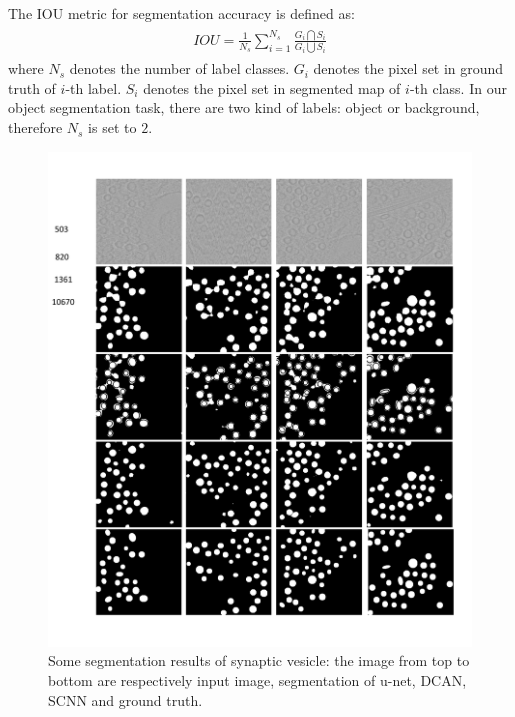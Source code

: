 The IOU metric for segmentation accuracy is defined as:
%
\begin{eqnarray}\label{fusion}
\begin{aligned}
IOU = \frac{1}{N_s}\sum_{i=1}^{N_s}\frac{G_i\bigcap S_i}{G_i\bigcup S_i}
\end{aligned}
\end{eqnarray}
%
where $N_s$ denotes the number of label classes.
$G_i$ denotes the pixel set in ground truth of $i$-th label.
$S_i$ denotes the pixel set in segmented map of $i$-th class.
In our object segmentation task, there are two kind of labels: object or background, therefore $N_s$ is set to $2$.

\begin{figure}
    \begin{center}
        \includegraphics[width=6.8in]{figures/FigVesicle.pdf}
    \end{center}
    \caption{Some segmentation results of synaptic vesicle: the image from top to bottom are respectively input image, segmentation of u-net, DCAN, SCNN and ground truth.}
    \label{FigVesicle}
\end{figure}


